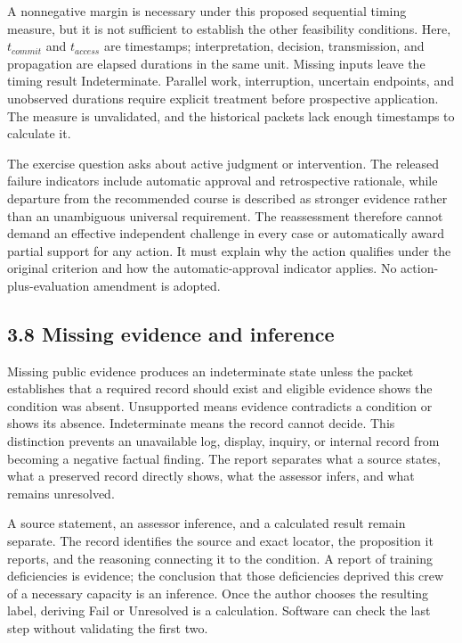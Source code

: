 \documentclass[11pt]{article}
\begin{document}
A nonnegative margin is necessary under this proposed sequential timing measure, but it is not sufficient to establish the other feasibility conditions. Here, \(t_{commit}\) and \(t_{access}\) are timestamps; interpretation, decision, transmission, and propagation are elapsed durations in the same unit. Missing inputs leave the timing result Indeterminate. Parallel work, interruption, uncertain endpoints, and unobserved durations require explicit treatment before prospective application. The measure is unvalidated, and the historical packets lack enough timestamps to calculate it.

The exercise question asks about active judgment or intervention. The released failure indicators include automatic approval and retrospective rationale, while departure from the recommended course is described as stronger evidence rather than an unambiguous universal requirement. The reassessment therefore cannot demand an effective independent challenge in every case or automatically award partial support for any action. It must explain why the action qualifies under the original criterion and how the automatic-approval indicator applies. No action-plus-evaluation amendment is adopted.

\subsection*{3.8 Missing evidence and inference}

Missing public evidence produces an indeterminate state unless the packet establishes that a required record should exist and eligible evidence shows the condition was absent. Unsupported means evidence contradicts a condition or shows its absence. Indeterminate means the record cannot decide. This distinction prevents an unavailable log, display, inquiry, or internal record from becoming a negative factual finding. The report separates what a source states, what a preserved record directly shows, what the assessor infers, and what remains unresolved.

A source statement, an assessor inference, and a calculated result remain separate. The record identifies the source and exact locator, the proposition it reports, and the reasoning connecting it to the condition. A report of training deficiencies is evidence; the conclusion that those deficiencies deprived this crew of a necessary capacity is an inference. Once the author chooses the resulting label, deriving Fail or Unresolved is a calculation. Software can check the last step without validating the first two.
\end{document}
